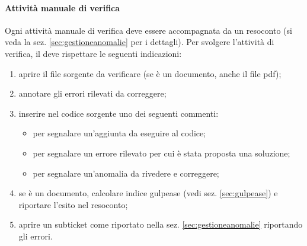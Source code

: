 	        \paragraph{Attività manuale di verifica}
	        Ogni attività manuale di verifica deve essere accompagnata da un resoconto (si veda la sez. \ref{sec:gestioneanomalie} per i dettagli). Per svolgere l'attività di verifica, il \verificatore{} deve rispettare le seguenti indicazioni:
	        \begin{enumerate}
	        	\item aprire il file sorgente da verificare (se è un documento, anche il file pdf);
	        	\item annotare gli errori rilevati da correggere;
	        	\item inserire nel codice sorgente uno dei seguenti commenti:
		        	\begin{itemize}
		        		\item {} per segnalare un'aggiunta da eseguire al codice;
		        		\item {} per segnalare un errore rilevato per cui è stata proposta una soluzione;
		        		\item {} per segnalare un'anomalia da rivedere e correggere;
		        	\end{itemize} 
	        	\item se è un documento, calcolare indice gulpease (vedi sez. \ref{sec:gulpease}) e riportare l'esito nel resoconto;
	        	\item aprire un subticket come riportato nella sez. \ref{sec:gestioneanomalie} riportando gli errori.
	        \end{enumerate}
    
